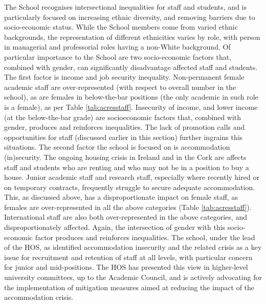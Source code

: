 The School recognises intersectional inequalities for staff and students, and is particularly focused on increasing ethnic diversity, and removing barriers due to socio-economic status.
While the School members come from varied ethnic backgrounds, the representation of different ethnicities varies by role, with person in managerial and professorial roles having a non-White background.
Of particular importance to the School are two socio-economic factors that, combined with gender, can significantly disadvantage affected staff and students. The first factor is income and job security inequality. Non-permanent female academic staff are over-represented (with respect to overall number in the school), as are females in below-the-bar positions (the only academic in such role is a female), as per Table \ref{tab:acresstaff}. Insecurity of income, and lower income (at the below-the-bar grade) are socioeconomic factors that, combined with gender, produces and reinforces inequalities.
The lack of promotion calls and opportunities for staff (discussed earlier in this section) further ingrains this situations. %
The second factor the school is focused on is accommodation (in)security. The ongoing housing crisis in Ireland and in the Cork are affects staff and students who are renting and who may not be in a position to buy a house. Junior academic staff and research staff, especially where recently hired or on temporary contracts, frequently struggle to secure adequate accommodation. This, as discussed above, has a disproportionate impact on female staff, as females are over-represented in all the above categories (Table \ref{tab:acresstaff}). International staff are also both over-represented in the above categories, and disproportionately affected. Again, the intersection of gender with this socio-economic factor produces and reinforces inequalities. The school, under the lead of the \ac{HOS}, as identified accommodation insecurity and the related crisis as a key issue for recruitment and retention of staff at all levels, with particular concern for junior and mid-positions. The \ac{HOS} has presented this view in higher-level university committees, up to the Academic Council, and is actively advocating for the implementation of mitigation measures aimed at reducing the impact of the accommodation crisis.
